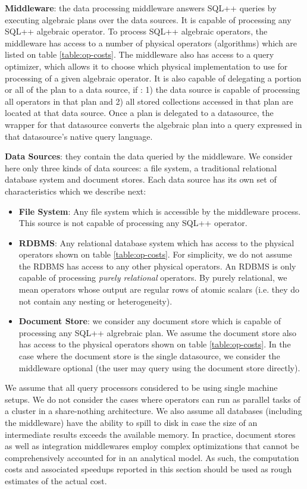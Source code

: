 \textbf{Middleware}: the data processing middleware answers SQL++ queries by executing algebraic plans over the data sources. It is capable of processing any SQL++ algebraic operator. To process SQL++ algebraic operators, the middleware has access to a number of physical operators (algorithms) which are listed on table \ref{table:op-costs}. The middleware also has access to a query optimizer, which allows it to choose which physical implementation to use for processing of a given algebraic operator. It is also capable of delegating a portion or all of the plan to a data source, if : 1) the data source is capable of processing all operators in that plan and 2) all stored collections accessed in that plan are located at that data source. Once a plan is delegated to a datasource, the wrapper for that datasource converts the algebraic plan into a query expressed in that datasource's native query language.

\textbf{Data Sources}: they contain the data queried by the middleware. We consider here only three kinds of data sources: a file system, a traditional relational database system and document stores. Each data source has its own set of characteristics which we describe next:

\begin{itemize}
\item{\textbf{File System}: Any file system which is accessible by the middleware process. This source is not capable of processing any SQL++ operator.}
\item{\textbf{RDBMS}: Any relational database system which has access to the physical operators shown on table \ref{table:op-costs}. For simplicity, we do not assume the RDBMS has access to any other physical operators. An RDBMS is only capable of processing \emph{purely relational} operators. By purely relational, we mean operators whose output are regular rows of atomic scalars (i.e. they do not contain any nesting or heterogeneity).}
\item{\textbf{Document Store}: we consider any document store which is capable of processing any SQL++ algrebraic plan. We assume the document store  also has access to the physical operators shown on table \ref{table:op-costs}. In the case where the document store is the single datasource, we consider the middleware optional (the user may query using the document store directly).}
\end{itemize} 

We assume that all query processors considered to be using single machine setups. We do not consider the cases where operators can run as parallel tasks of a cluster in a share-nothing architecture. We also assume all databases (including the middleware) have the ability to spill to disk in case the size of an intermediate results exceeds the available memory. In practice, document stores as well as integration middlewares employ complex optimizations that cannot be comprehensively accounted for in an analytical model. As such, the computation costs and associated speedups reported in this section should be used as rough estimates of the actual cost.

